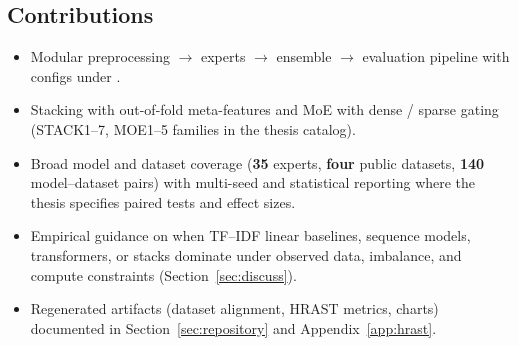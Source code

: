 \subsection{Contributions}
\begin{itemize}
  \item Modular preprocessing $\rightarrow$ experts $\rightarrow$ ensemble $\rightarrow$ evaluation pipeline with configs under .
  \item Stacking with out-of-fold meta-features and MoE with dense / sparse gating (STACK1--7, MOE1--5 families in the thesis catalog).
  \item Broad model and dataset coverage (\textbf{35} experts, \textbf{four} public datasets, \textbf{140} model--dataset pairs) with multi-seed and statistical reporting where the thesis specifies paired tests and effect sizes.
  \item Empirical guidance on when TF--IDF linear baselines, sequence models, transformers, or stacks dominate under observed data, imbalance, and compute constraints (Section~\ref{sec:discuss}).
  \item Regenerated  artifacts (dataset alignment, HRAST metrics, charts) documented in Section~\ref{sec:repository} and Appendix~\ref{app:hrast}.
\end{itemize}
